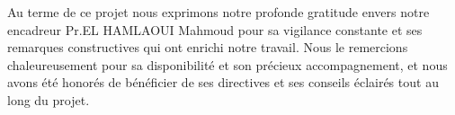 Au terme de ce projet nous exprimons notre profonde gratitude envers notre encadreur Pr.EL HAMLAOUI Mahmoud pour sa vigilance constante  et ses remarques constructives qui ont enrichi notre travail. Nous le remercions chaleureusement pour sa disponibilité et son précieux accompagnement, et nous avons été honorés de bénéficier de ses directives et  ses conseils éclairés tout au long du projet. 

